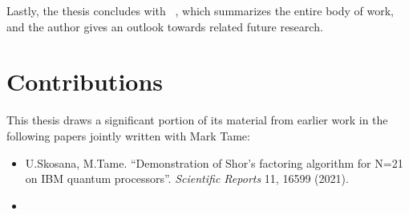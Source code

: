 \bigskip
\noindent
Lastly, the thesis concludes with ~, which summarizes the entire body of work, and the author gives an outlook towards related future research.

\section{Contributions}

This thesis draws a significant portion of its material from earlier work in the following papers jointly written with Mark Tame:

\begin{itemize}
    \item U.Skosana, M.Tame. \enquote{Demonstration of Shor’s factoring algorithm for N=21 on IBM quantum processors}. \emph{Scientific Reports} 11, 16599 (2021).
	\item {}
\end{itemize}
